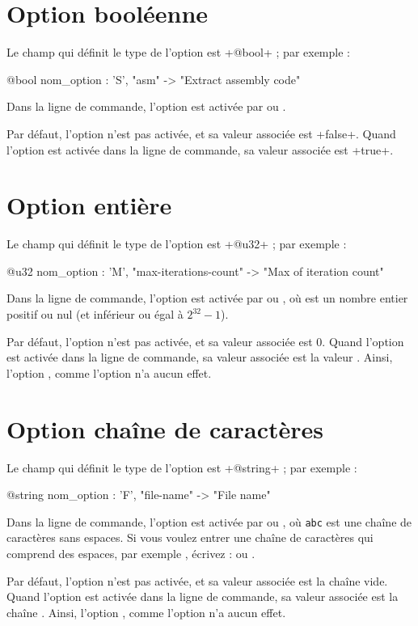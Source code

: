 \section{Option booléenne}

Le champ qui définit le type de l'option est \ggsq+@bool+ ; par exemple :
\begin{galgas4}
  @bool nom_option : 'S', "asm" -> "Extract assembly code"
\end{galgas4}

Dans la ligne de commande, l'option est activée par  ou .

Par défaut, l'option n'est pas activée, et sa valeur associée est \ggsq+false+. Quand l'option est activée dans la ligne de commande, sa valeur associée est \ggsq+true+.








\section{Option entière}

Le champ qui définit le type de l'option est \ggsq+@u32+ ; par exemple :
\begin{galgas4}
  @u32 nom_option : 'M', "max-iterations-count" -> "Max of iteration count"
\end{galgas4}

Dans la ligne de commande, l'option est activée par  ou , où  est un nombre entier positif ou nul (et inférieur ou égal à $2^{32}-1$).

Par défaut, l'option n'est pas activée, et sa valeur associée est $0$. Quand l'option est activée dans la ligne de commande, sa valeur associée est la valeur . Ainsi, l'option , comme l'option  n'a aucun effet.










\section{Option chaîne de caractères}

Le champ qui définit le type de l'option est \ggsq+@string+ ; par exemple :
\begin{galgas4}
  @string nom_option : 'F', "file-name" -> "File name"
\end{galgas4}

Dans la ligne de commande, l'option est activée par  ou , où \texttt{abc} est une chaîne de caractères sans espaces. Si vous voulez entrer une chaîne de caractères qui comprend des espaces, par exemple , écrivez :  ou .

Par défaut, l'option n'est pas activée, et sa valeur associée est la chaîne vide. Quand l'option est activée dans la ligne de commande, sa valeur associée est la chaîne . Ainsi, l'option , comme l'option  n'a aucun effet.


